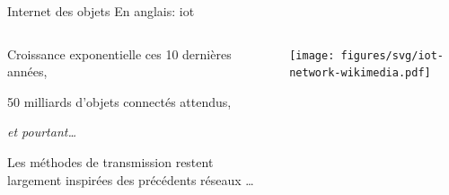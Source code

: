 \documentclass[../main.tex]{subfiles}
\begin{document}
\begin{frame}{Internet des objets}
  {En anglais: \acrfull{iot}}
  \begin{columns}
    \begin{column}{.55\linewidth}
      \begin{overlayarea}{\linewidth}{.6\textheight}
        \begin{ctrlitemize}{5pt}
          \item Croissance exponentielle ces 10 dernières années,
          \item 50 milliards d'objets connectés attendus,
        \end{ctrlitemize}

        \hspace{7 em} \emph{et pourtant\dots}

        \begin{ctrlitemize}{2pt}
          \item Les méthodes de transmission restent largement inspirées des précédents réseaux \dots
        \end{ctrlitemize}
      \end{overlayarea}
    \end{column}
    \begin{column}{.4\linewidth}
      \begin{center}
        \texttt{[image: figures/svg/iot-network-wikimedia.pdf]}
      \end{center}
    \end{column}
  \end{columns}
\end{frame}
\end{document}
